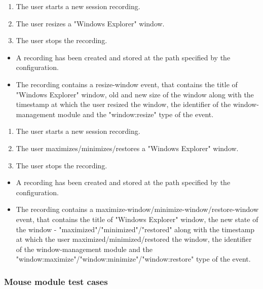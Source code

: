 \begin{tests}
	{\begin{enumerate}
		\item The \gls{user} starts a new session recording.
		\item The \gls{user} resizes a "Windows Explorer" window.
		\item The \gls{user} stops the recording.
	\end{enumerate}}
	{\begin{itemize}
		\item A recording has been created and stored at the path specified by the configuration.
		\item The recording contains a resize-window event, that contains the title of "Windows Explorer" window, old and new size of the window along with the timestamp at which the user resized the window, the identifier of the window-management module and the "window:resize" type of the event.
	\end{itemize}}
	
	{\begin{enumerate}
		\item The \gls{user} starts a new session recording.
		\item The \gls{user} maximizes/minimizes/restores a "Windows Explorer" window.
		\item The \gls{user} stops the recording.
	\end{enumerate}}
	{\begin{itemize}
		\item A recording has been created and stored at the path specified by the configuration.
		\item The recording contains a maximize-window/minimize-window/restore-window event, that contains the title of "Windows Explorer" window, the new state of the window - "maximized"/"minimized"/"restored" along with the timestamp at which the user maximized/minimized/restored the window, the identifier of the window-management module and the "window:maximize"/"window:minimize"/"window:restore" type of the event.
	\end{itemize}}
\end{tests}

\subsubsection{Mouse module test cases}

